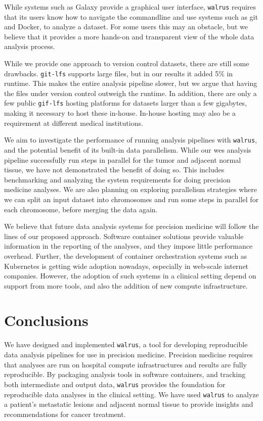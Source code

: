 While systems such as Galaxy provide a graphical user interface, \texttt{walrus}
requires that its users know how to navigate the commandline and use systems
such as git and Docker, to analyze a dataset. For some users this may an
obstacle, but we believe that it provides a more hands-on and transparent view
of the whole data analysis process. 

While we provide one approach to version control datasets, there are still some
drawbacks. \texttt{git-lfs} supports large files, but in our results it added
5\% in runtime.  This makes the entire analysis pipeline slower, but we argue
that having the files under version control outweigh the runtime. In addition,
there are only a few public \texttt{gif-lfs} hosting platforms for datasets
larger than a few gigabytes, making it necessary to host these in-house.
In-house hosting may also be a requirement at different medical institutions.  

We aim to investigate the performance of running analysis pipelines with
\texttt{walrus}, and the potential benefit of its built-in data parallelism.
While our \gls{wes} analysis pipeline successfully run steps in parallel for the
tumor and adjacent normal tissue, we have not demonstrated the benefit
of doing so. This includes benchmarking and analyzing the system requirements
for doing precision medicine analyses.  We are also planning on exploring
parallelism strategies where we can split an input dataset into chromosomes and
run some steps in parallel for each chromosome, before merging the data again. 

We believe that future data analysis systems for precision medicine will follow
the lines of our proposed approach. Software container solutions provide
valuable information in the reporting of the analyses, and they impose little
performance overhead. Further, the development of container orchestration
systems such as Kubernetes is getting wide adoption nowadays, especially in
web-scale internet companies. However, the adoption of such systems in a
clinical setting depend on support from more tools, and also the addition
of new compute infrastructure. 

\section{Conclusions} 
We have designed and implemented \texttt{walrus}, a tool for developing 
reproducible data analysis pipelines for use in precision medicine. Precision
medicine requires that analyses are run on hospital compute infrastructures and
results are fully reproducible. By packaging analysis tools in software
containers, and tracking both intermediate and output data, \texttt{walrus}
provides the foundation for reproducible data analyses in the clinical setting.
We have used \texttt{walrus} to analyze a patient's metastatic lesions and
adjacent normal tissue to provide insights and recommendations for  cancer
treatment. 
